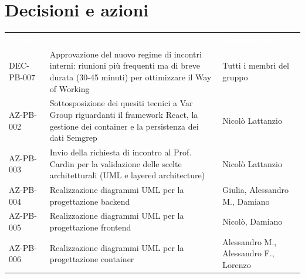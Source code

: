 \documentclass[a4paper, 11pt]{article}
\begin{document}
\section{Decisioni e azioni} \label{DecisioniAzioni}
\begin{center}
    \begin{tabular}{>{\centering\arraybackslash}m{3cm} >{\raggedright\arraybackslash}p{7cm} >{\centering\arraybackslash}p{2.5cm}}
        \rowcolor{AccentColor}
        \textcolor{white}{\textbf{Codice }} & 
        \multicolumn{1}{c}{\textcolor{white}{\textbf{Descrizione}}} & 
        \textcolor{white}{\textbf{Assegnatario}} \\
        DEC-PB-007 & Approvazione del nuovo regime di incontri interni: riunioni più frequenti ma di breve durata (30-45 minuti) per ottimizzare il Way of Working & Tutti i membri del gruppo \\
        \midrule
        AZ-PB-002 & Sottosposizione dei quesiti tecnici a Var Group riguardanti il framework React, la gestione dei container e la persistenza dei dati Semgrep & Nicolò Lattanzio\\
        AZ-PB-003 & Invio della richiesta di incontro al Prof. Cardin per la validazione delle scelte architetturali (UML e layered architecture) & Nicolò Lattanzio\\
        AZ-PB-004 & Realizzazione diagrammi UML per la progettazione backend & Giulia, Alessandro M., Damiano\\
        AZ-PB-005 & Realizzazione diagrammi UML per la progettazione frontend & Nicolò, Damiano\\
        AZ-PB-006 & Realizzazione diagrammi UML per la progettazione container & Alessandro M., Alessandro F., Lorenzo\\
    \end{tabular}
\end{center}
\end{document}

